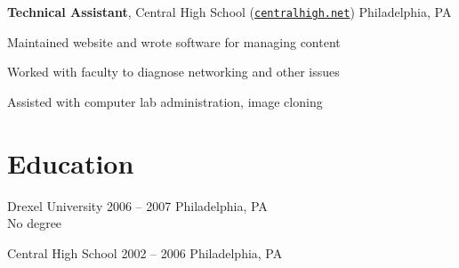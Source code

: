 \documentclass[11pt]{article}
\begin{document}
\begin{description*}
        \textbf{Technical Assistant}, Central High School (\href{http://centralhigh.net}{\texttt{centralhigh.net}}) \hfill Philadelphia, PA
        \begin{itemize*}
            \item Maintained website and wrote software for managing content
            \item Worked with faculty to diagnose networking and other issues
            \item Assisted with computer lab administration, image cloning
        \end{itemize*}
\end{description*}

\section*{Education}
\begin{description*}
    \item[Drexel University] 2006 -- 2007 \hfill Philadelphia, PA \\
        No degree
    \item[Central High School] 2002 -- 2006 \hfill Philadelphia, PA
\end{description*}
\end{document}
